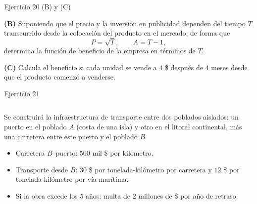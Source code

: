 \documentclass[aspectratio=169]{beamer}
\begin{document}
\begin{frame}{Ejercicio 20 (B) y (C)}
  \begin{mwejercicio}
    \textbf{(B)} Suponiendo que el precio y la inversión en publicidad dependen
    del tiempo \(T\) transcurrido desde la colocación del producto en el
    mercado, de forma que
    \[
      P=\sqrt{T},\qquad A=T-1,
    \]
    determina la función de beneficio de la empresa en términos de \(T\).

    \textbf{(C)} Calcula el beneficio si cada unidad se vende a \(4\) \$ después
    de \(4\) meses desde que el producto comenzó a venderse.
  \end{mwejercicio}
\end{frame}

\begin{frame}{Ejercicio 21}
  \mwtopanchoroff
  \begin{columns}[T]
    \begin{mwejercicio}
      \small
      Se construirá la infraestructura de transporte entre dos poblados
      aislados: un puerto en el poblado \(A\) (costa de una isla) y otro en el
      litoral continental, más una carretera entre este puerto y el poblado
      \(B\).
      \begin{itemize}
        \item Carretera \(B\)--puerto: \(500\) mil \$ por kilómetro.
        \item Transporte desde \(B\): \(30\) \$ por tonelada-kilómetro por
        carretera y \(12\) \$ por tonelada-kilómetro por vía marítima.
        \item Si la obra excede los \(5\) años: multa de \(2\) millones de \$
        por año de retraso.
      \end{itemize}
    \end{mwejercicio}
    \centering
  \end{columns}
  \vfill
  \mwtopanchoron
\end{frame}
\end{document}
